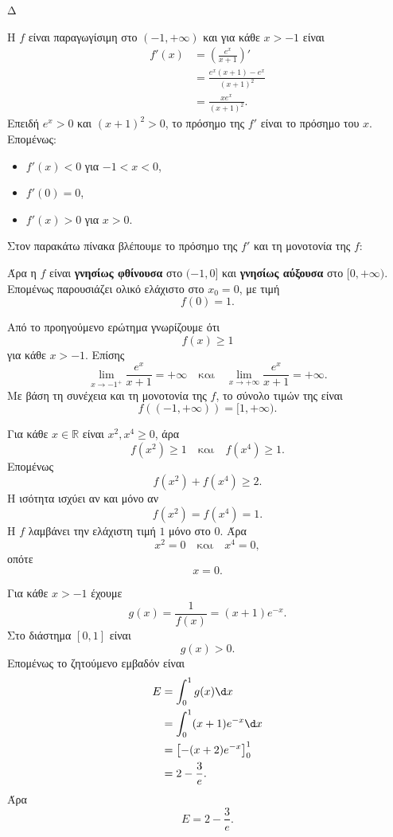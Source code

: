 \begin{thema}{Δ}
\begin{erwthma}
\item Η $f$ είναι παραγωγίσιμη στο $(-1,+\infty)$ και για κάθε $x>-1$ είναι
\begin{align*}
f'(x)
&=\left(\frac{e^x}{x+1}\right)'\\
&=\frac{e^x(x+1)-e^x}{(x+1)^2}\\
&=\frac{xe^x}{(x+1)^2}.
\end{align*}
Επειδή $e^x>0$ και $(x+1)^2>0$, το πρόσημο της $f'$ είναι το πρόσημο του $x$. Επομένως:
\begin{itemize}
\item $f'(x)<0$ για $-1<x<0$,
\item $f'(0)=0$,
\item $f'(x)>0$ για $x>0$.
\end{itemize}
Στον παρακάτω πίνακα βλέπουμε το πρόσημο της $f'$ και τη μονοτονία της $f$:
\begin{center}
\end{center}

Άρα η $f$ είναι \textbf{γνησίως φθίνουσα} στο $(-1,0]$ και \textbf{γνησίως αύξουσα} στο $[0,+\infty)$. Επομένως παρουσιάζει ολικό ελάχιστο στο $x_0=0$, με τιμή
\[
{f(0)=1}.
\]

\item Από το προηγούμενο ερώτημα γνωρίζουμε ότι
\[
f(x)\geq1
\]
για κάθε $x>-1$. Επίσης
\[
\lim_{x\to-1^+}\frac{e^x}{x+1}=+\infty
\quad\text{και}\quad
\lim_{x\to+\infty}\frac{e^x}{x+1}=+\infty.
\]
Με βάση τη συνέχεια και τη μονοτονία της $f$, το σύνολο τιμών της είναι
\[
{f((-1,+\infty))=[1,+\infty)}.
\]

\item Για κάθε $x\in\mathbb{R}$ είναι $x^2,x^4\geq0$, άρα
\[
f(x^2)\geq1
\quad\text{και}\quad
f(x^4)\geq1.
\]
Επομένως
\[
f(x^2)+f(x^4)\geq2.
\]
Η ισότητα ισχύει αν και μόνο αν
\[
f(x^2)=f(x^4)=1.
\]
Η $f$ λαμβάνει την ελάχιστη τιμή $1$ μόνο στο $0$. Άρα
\[
x^2=0
\quad\text{και}\quad
x^4=0,
\]
οπότε
\[
{x=0}.
\]

\item Για κάθε $x>-1$ έχουμε
\[
g(x)=\frac{1}{f(x)}=(x+1)e^{-x}.
\]
Στο διάστημα $[0,1]$ είναι
\[
g(x)>0.
\]
Επομένως το ζητούμενο εμβαδόν είναι
\begin{align*}
E
&=\int_0^1g(x)\d x\\
&=\int_0^1(x+1)e^{-x}\d x\\
&=\left[-(x+2)e^{-x}\right]_0^1\\
&=2-\frac{3}{e}.
\end{align*}
Άρα
\[
{E=2-\frac{3}{e}}.
\]
\end{erwthma}
\end{thema}

